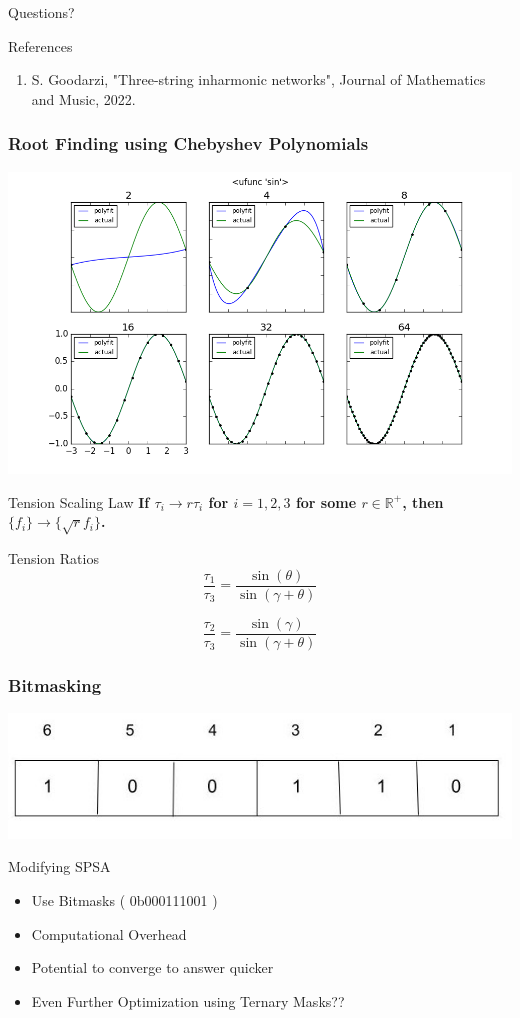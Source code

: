 \documentclass{beamer}
\begin{document}
\begin{frame}
\centering\Huge{\Huge{Questions?}}
\end{frame}
\begin{frame}{References}
    \begin{enumerate}
        \item S. Goodarzi, "Three-string inharmonic networks", Journal of Mathematics and Music, 2022.
    \end{enumerate}
\end{frame}
\begin{frame}
\frametitle{Root Finding using Chebyshev Polynomials}
    \centering
    \includegraphics[width=\textwidth,height=\textheight,keepaspectratio]{polynomial_fitting.png}
\end{frame}
\begin{frame}{Tension Scaling Law}
    \Huge{\textbf{If $\tau_i \to r\tau_i$ for $i = 1, 2, 3$ for some $r \in \mathbb{R}^+$, then $\{f_i\} \to \{\sqrt{r} f_i\}$.}}

\end{frame}
\begin{frame}{Tension Ratios}
    \centering
\Huge{
    \[\frac{\tau_1}{\tau_3} = \frac{\sin(\theta)}{\sin(\gamma+\theta)}\]}

    \vspace{.5cm}
\Huge{
    \[\frac{\tau_2}{\tau_3} = \frac{\sin(\gamma)}{\sin(\gamma+\theta)}\]}
\end{frame}
\begin{frame}
\frametitle{Bitmasking}
    \centering
    \includegraphics[width=1.02\textwidth,height=1.4\textheight,keepaspectratio]{bitmasking.png}
\end{frame}
\begin{frame}{Modifying SPSA}
    \begin{itemize}
        \item Use Bitmasks ( 0b000111001 )
        \item Computational Overhead
        \item Potential to converge to answer quicker
        \item Even Further Optimization using Ternary Masks??
    \end{itemize}
\end{frame}
\end{document}
